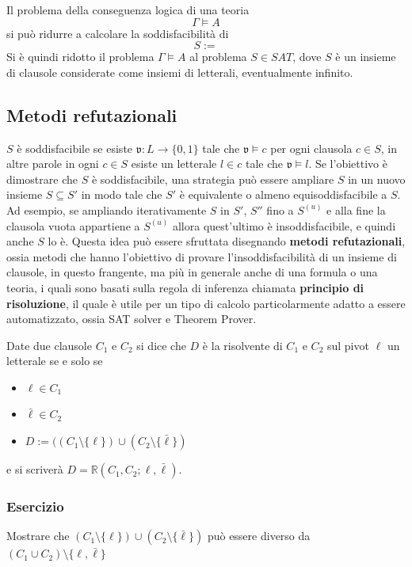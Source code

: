Il problema della conseguenza logica di una teoria 
$$
\Gamma \models A
$$
si può ridurre a calcolare la soddisfacibilità di 
$$
S := 
$$
Si è quindi ridotto il problema $\Gamma \models A$ al problema $S \in SAT$,
dove $S$ è un insieme di clausole considerate come insiemi di letterali, 
eventualmente infinito. 


\subsection{Metodi refutazionali}
$S$ è soddisfacibile se esiste $\mathfrak{v}:L \rightarrow \{0,1\}$ tale 
che $\mathfrak{v} \models c$ per ogni clausola $c \in S$, in altre parole 
in ogni $c \in S$ esiste un letterale $l \in c$ tale che $\mathfrak{v} \models l$. 
Se l'obiettivo è dimostrare che $S$ è soddisfacibile, una strategia 
può essere ampliare $S$ in un nuovo insieme $S \subseteq S'$ in modo 
tale che $S'$ è equivalente o almeno equisoddisfacibile a $S$.
Ad esempio, se ampliando iterativamente $S$ in $S'$, $S''$ fino a $S^{(u)}$ 
e alla fine la clausola vuota appartiene a $S^{(u)}$ allora quest'ultimo 
è insoddisfacibile, e quindi anche $S$ lo è. Questa idea può essere sfruttata 
disegnando \textbf{metodi refutazionali}, ossia metodi che hanno l'obiettivo di 
provare l'insoddisfacibilità di un insieme di clausole, in questo frangente, 
ma più in generale anche di una formula o una teoria, i quali sono basati 
sulla regola di inferenza chiamata \textbf{principio di risoluzione}, 
il quale è utile per un tipo di calcolo particolarmente adatto a essere automatizzato, 
ossia SAT solver e Theorem Prover. 

\begin{defi}
        Date due clausole $C_1$ e $C_2$ si dice che $D$ è la risolvente 
        di $C_1$ e $C_2$ sul pivot $\ell$ un letterale se e solo se
        \begin{itemize}
                \item $\ell \in C_1$
                \item $\bar{\ell} \in C_2$
                \item $D := ((C_1 \setminus \{\ell\}) \cup (C_2 \setminus \{\bar{\ell}\})$
        \end{itemize}
       e si scriverà $D = \mathbb{R}(C_1,C_2; \ell, \bar{\ell})$. 
\end{defi}

\subsubsection{Esercizio}
Mostrare che $(C_1 \setminus \{\ell\}) \cup (C_2 \setminus \{\bar{\ell}\})$ può essere 
diverso da $(C_1 \cup C_2) \setminus \{\ell, \bar{\ell}\}$

